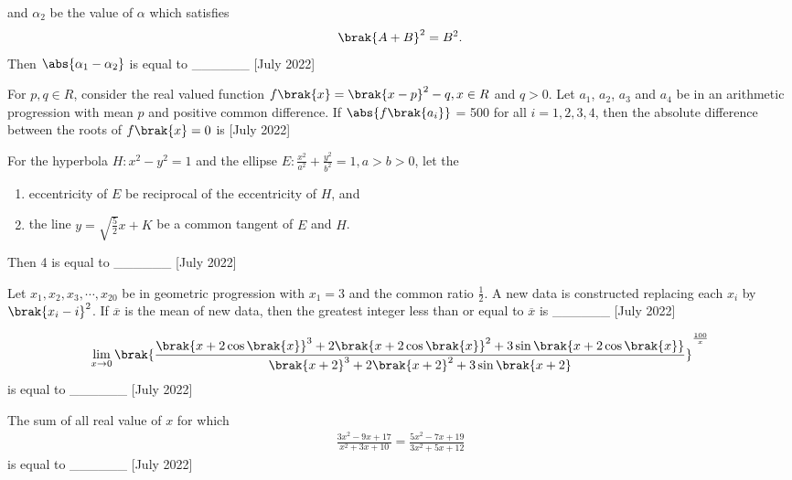and $\alpha_2$ be the value of $\alpha$ which satisfies
\begin{align*}
    \brak{A+B}^2 = B^2.
\end{align*}
Then $\abs{\alpha_1 - \alpha_2}$ is equal to \_\_\_\_\_\_ \hfill[July 2022] \\
\item For $p, q \in R$, consider the real valued function $f\brak{x} = \brak{x - p}^2 - q, x \in R$ and $q > 0$. Let $a_1$, $a_2$, $a_3$ and $a_4$ be in an arithmetic progression with mean $p$ and positive common difference. If $\abs{f\brak{a_i}}$ = 500 for all $i = 1, 2, 3, 4$, then the absolute difference between the roots of $f\brak{x} = 0$ is \hfill[July 2022] \\
\item For the hyperbola $H: x^2 - y^2 = 1$ and the ellipse $E: \frac{x^2}{a^2} + \frac{y^2}{b^2} = 1, a > b > 0$, let the
\begin{enumerate}
    \item eccentricity of $E$ be reciprocal of the eccentricity of $H$, and
    \item the line $y = \sqrt{\frac{5}{2}} x + K$ be a common tangent of $E$ and $H$.
\end{enumerate}
Then 4 is equal to \_\_\_\_\_\_ \hfill[July 2022] \\
\item Let $x_1, x_2, x_3, \cdots, x_{20}$ be in geometric progression with $x_1 = 3$ and the common ratio $\frac{1}{2}$. A new data is constructed replacing each $x_i$ by $\brak{x_i - i}^2$. If $\overline{x}$ is the mean of new data, then the greatest integer less than or equal to $\overline{x}$ is  \_\_\_\_\_\_ \hfill[July 2022] \\
\item 
\begin{align*}
    \lim\limits_{x \rightarrow 0}\brak{\frac{\brak{x+2\cos\brak{x}}^3 + 2\brak{x+2\cos\brak{x}}^2 + 3\sin\brak{x+2\cos\brak{x}}}{\brak{x+2}^3 + 2\brak{x+2}^2 + 3\sin\brak{x+2}}}^\frac{100}{x}
\end{align*}
is equal to \_\_\_\_\_\_ \hfill[July 2022] \\
\item The sum of all real value of $x$ for which
\begin{align*}
    \frac{3x^2-9x+17}{x^2+3x+10} = \frac{5x^2-7x+19}{3x^2+5x+12}
\end{align*}
is equal to \_\_\_\_\_\_ \hfill[July 2022] \\
